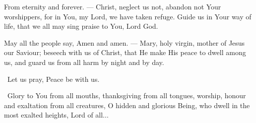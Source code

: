 \documentclass[12pt,twoside,a5paper]{article}
\begin{document}




\begin{halfparskip}
  From eternity and forever. --- Christ, neglect us not, abandon not Your worshippers, for in You, my Lord, we have taken refuge. Guide us in Your way of life, that we all may sing praise to You, Lord God.

  May all the people say, Amen and amen. --- Mary, holy virgin, mother of Jesus our Saviour; beseech with us of Christ, that He make His peace to dwell among us, and guard us from all harm by night and by day.
\end{halfparskip}


\rr~Let us pray, Peace be with us.

\cc~Glory to You from all mouths, thanksgiving from all tongues, worship, honour and exaltation from all creatures, O hidden and glorious Being, who dwell in the most exalted heights, Lord of all...





\end{document}
